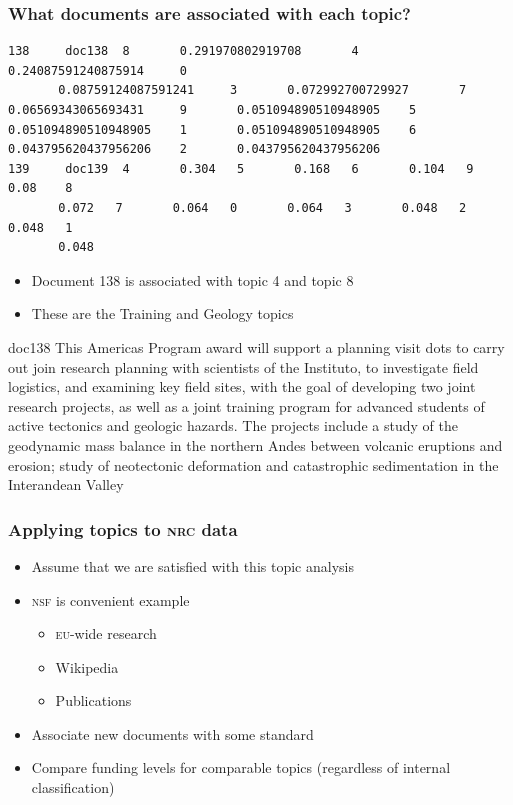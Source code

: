 \begin{frame}[fragile]
  \frametitle{What documents are associated with each topic?}

  \begin{lstlisting}
138     doc138  8       0.291970802919708       4       0.24087591240875914     0
       0.08759124087591241     3       0.072992700729927       7       0.06569343065693431     9       0.051094890510948905    5       0.051094890510948905    1       0.051094890510948905    6       0.043795620437956206    2       0.043795620437956206
139     doc139  4       0.304   5       0.168   6       0.104   9       0.08    8
       0.072   7       0.064   0       0.064   3       0.048   2       0.048   1
       0.048  
    \end{lstlisting}

    \begin{itemize}
      \item Document 138 is associated with topic 4 and topic 8
        \item These are the Training and Geology topics
      \end{itemize}

      \pause

      \vspace{-3cm}

  \begin{block}{doc138}
    \small
This Americas Program award will support a planning visit 
dots  to carry out join research planning with scientists of the Instituto, to investigate field logistics, and examining key field sites, with the goal of developing two joint research projects, as well as a joint training program for advanced students of active tectonics and geologic hazards. The projects include a study of the geodynamic mass balance in the northern Andes between volcanic eruptions and erosion; study of neotectonic deformation and catastrophic sedimentation in the Interandean Valley
  \end{block}

\end{frame}


\begin{frame}
  \frametitle{Applying topics to \textsc{nrc} data}
  \begin{itemize}
    \item Assume that we are satisfied with this topic analysis
    \item \textsc{nsf} is convenient example
      \begin{itemize}
        \item \textsc{eu}-wide research
        \item Wikipedia
        \item Publications
      \end{itemize}
      \item Associate \alert<2>{new documents} with some \alert<3>{standard}
      \item Compare funding levels for comparable topics (regardless of internal classification)
  \end{itemize}

\end{frame}


